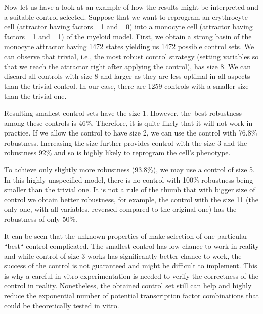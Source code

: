 Now let us have a look at an example of how the results might be interpreted and a suitable control selected. Suppose that we want to reprogram an erythrocyte cell (attractor having factors =1 and =0) into a monocyte cell (attractor having factors =1 and =1) of the myeloid model. First, we obtain a strong basin of the monocyte attractor having 1472 states yielding us 1472 possible control sets. We can observe that trivial, i.e., the most robust control strategy (setting variables so that we reach the attractor right after applying the control), has size 8. We can discard all controls with size 8 and larger as they are less optimal in all aspects than the trivial control. In our case, there are 1259 controls with a smaller size than the trivial one. 

Resulting smallest control sets have the size 1. However, the~best robustness among these controls is 46\%. Therefore, it is quite likely that it will not work in practice. If we allow the control to have size 2, we can use the control with 76.8\% robustness. Increasing the size further provides control with the size 3 and the robustness 92\% and so is highly likely to reprogram the cell's phenotype. 

To achieve only slightly more robustness (93.8\%), we may use a control of size 5. In this highly unspecified model, there is no control with 100\% robustness being smaller than the trivial one. It is not a rule of the thumb that with bigger size of control we obtain better robustness, for example, the control with the size 11 (the only one, with all variables, reversed compared to the original one) has the robustness of only 50\%. 

It can be seen that the unknown properties of \PBN{} make selection of one particular ``best`` control complicated. The smallest control has low chance to work in reality and while control of size 3 works has significantly better chance to work, the success of the control is not guaranteed and might be difficult to implement. This is why a careful in vitro experimentation is needed to verify the correctness of the control in reality. Nonetheless, the obtained control set still can help and highly reduce the exponential number of potential transcription factor combinations that could be theoretically tested in vitro.

